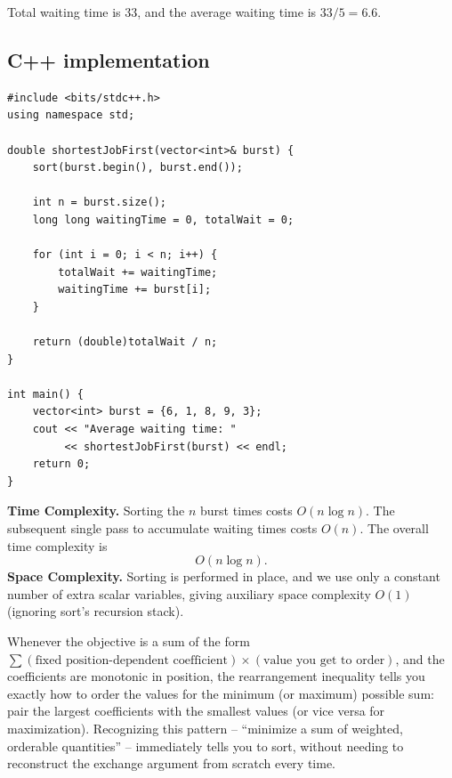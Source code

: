 Total waiting time is $33$, and the average waiting time is
$33 / 5 = 6.6$.

\subsection*{C++ implementation}

\begin{lstlisting}
#include <bits/stdc++.h>
using namespace std;

double shortestJobFirst(vector<int>& burst) {
    sort(burst.begin(), burst.end());

    int n = burst.size();
    long long waitingTime = 0, totalWait = 0;

    for (int i = 0; i < n; i++) {
        totalWait += waitingTime;
        waitingTime += burst[i];
    }

    return (double)totalWait / n;
}

int main() {
    vector<int> burst = {6, 1, 8, 9, 3};
    cout << "Average waiting time: "
         << shortestJobFirst(burst) << endl;
    return 0;
}
\end{lstlisting}

\begin{complexitybox}
\textbf{Time Complexity.} Sorting the $n$ burst times costs
$O(n \log n)$. The subsequent single pass to accumulate waiting times costs
$O(n)$. The overall time complexity is
\[
  O(n \log n).
\]
\textbf{Space Complexity.} Sorting is performed in place, and we use only a
constant number of extra scalar variables, giving auxiliary space
complexity $O(1)$ (ignoring sort's recursion stack).
\end{complexitybox}

\begin{takeawaybox}
Whenever the objective is a sum of the form $\sum (\text{fixed
position-dependent coefficient}) \times (\text{value you get to order})$,
and the coefficients are monotonic in position, the rearrangement
inequality tells you exactly how to order the values for the minimum (or
maximum) possible sum: pair the largest coefficients with the smallest
values (or vice versa for maximization). Recognizing this pattern --
``minimize a sum of weighted, orderable quantities'' -- immediately tells
you to sort, without needing to reconstruct the exchange argument from
scratch every time.
\end{takeawaybox}
